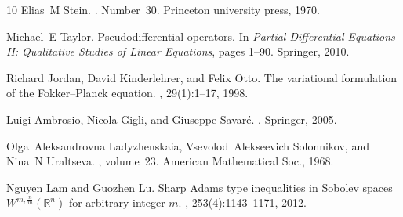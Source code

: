 \documentclass[11pt,reqno]{amsart}
\theoremstyle{definition}
\theoremstyle{remark}
\begin{document}
\begin{thebibliography}{10}
Elias~M Stein.
.
\newblock Number~30. Princeton university press, 1970.

Michael~E Taylor.
\newblock Pseudodifferential operators.
\newblock In {\em Partial Differential Equations {I}{I}: Qualitative Studies of Linear Equations}, pages 1--90. Springer, 2010.

Richard Jordan, David Kinderlehrer, and Felix Otto.
\newblock The variational formulation of the {F}okker--{P}lanck equation.
, 29(1):1--17, 1998.

Luigi Ambrosio, Nicola Gigli, and Giuseppe Savar{\'e}.
.
\newblock Springer, 2005.

Olga~Aleksandrovna Ladyzhenskaia, Vsevolod~Alekseevich Solonnikov, and Nina~N Uraltseva.
, volume~23.
\newblock American Mathematical Soc., 1968.

Nguyen Lam and Guozhen Lu.
\newblock Sharp {A}dams type inequalities in {S}obolev spaces $W^{m,\frac{n}{m}}(\mathbb{R}^n)$ for arbitrary integer $m$.
, 253(4):1143--1171, 2012.

\end{thebibliography}
\end{document}
